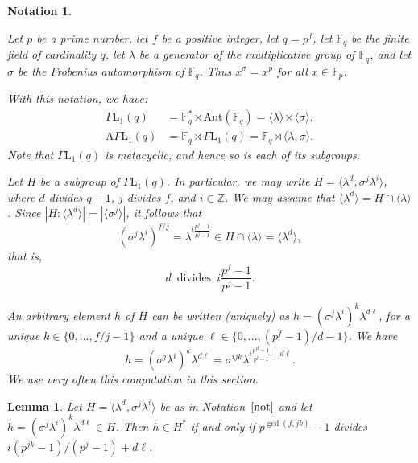 \documentclass{amsart}
\newtheorem{lemma}[theorem]{Lemma}
\newtheorem{notation}[theorem]{Notation}
\begin{document}
\begin{notation}\label{not}{\rm
Let $p$ be a prime number, let $f$ be a positive integer, let $q = p^f$, let $\mathbb{F}_q$ be the finite field of cardinality $q$, let $\lambda$ be a generator of the multiplicative group of $\mathbb{F}_q$, and let $\sigma$ be the Frobenius automorphism of $\mathbb{F}_q$. Thus $x^\sigma = x^p$ for all $x \in \mathbb{F}_p$.

With this notation, we have:
\begin{align*}
\Gamma\mathrm{L}_1(q) &= \mathbb{F}_q^\ast \rtimes \mathrm{Aut}(\mathbb{F}_q) = \langle \lambda \rangle \rtimes \langle \sigma \rangle,\\
\mathrm{A}\Gamma\mathrm{L}_1(q) &= \mathbb{F}_q \rtimes \Gamma\mathrm{L}_1(q) = \mathbb{F}_q \rtimes \langle \lambda, \sigma \rangle.
\end{align*}
Note that $\Gamma\mathrm{L}_1(q)$ is metacyclic, and hence so is each of its subgroups.

Let $H$ be a subgroup of $\Gamma\mathrm{L}_1(q)$. In particular, we may write $H = \langle \lambda^d, \sigma^j \lambda^i \rangle$, where $d$ divides $q - 1$, $j$ divides $f$, and $i \in \mathbb{Z}$. We may assume that $\langle \lambda^d \rangle = H \cap \langle \lambda \rangle$. Since $|H : \langle \lambda^d \rangle| = |\langle \sigma^j \rangle|$, it follows that
$$(\sigma^j\lambda^i)^{f/j} = \lambda^{i\frac{p^f - 1}{p^j - 1}} \in H \cap \langle \lambda \rangle = \langle \lambda^d \rangle,$$
that is,
\begin{equation}\label{eq:neq1}
d\, \text{ divides }\, i\frac{p^f - 1}{p^j - 1}.
\end{equation}

An arbitrary element $h$ of $H$ can be written (uniquely) as $h=(\sigma^j\lambda^i)^k\lambda^{d\ell}$, for a unique $k\in \{0,\ldots,f/j-1\}$ and a unique $\ell\in \{0,\ldots,(p^f-1)/d-1\}$. We have
\begin{equation}\label{often}
h=(\sigma^j\lambda^i)^k\lambda^{d\ell}=\sigma^{ijk}\lambda^{i\frac{p^{jk}-1}{p^j-1}+d\ell}.
\end{equation}
We use very often this computation in this section.
}
\end{notation}

\begin{lemma}\label{lemma:mercoledi1}
Let $H = \langle \lambda^d, \sigma^j \lambda^i \rangle$ be as in Notation~$\ref{not}$ and let $h = (\sigma^j \lambda^i)^k \lambda^{d\ell} \in H$. Then $h \in H^\ast$ if and only if $p^{\gcd(f,jk)} - 1$ divides $i(p^{jk} - 1)/(p^j - 1) + d\ell$.
\end{lemma}
\end{document}

